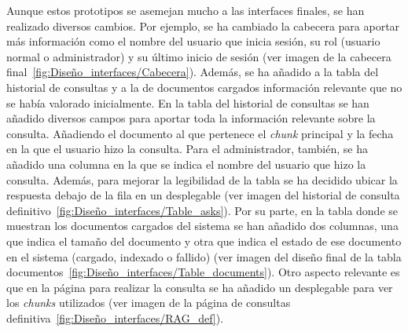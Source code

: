 
Aunque estos prototipos se asemejan mucho a las interfaces finales, se han realizado diversos cambios. Por ejemplo, se ha cambiado la cabecera para aportar más información como el nombre del usuario que inicia sesión, su rol (usuario normal o administrador) y su último inicio de sesión (ver imagen de la cabecera final~\ref{fig:Diseño_interfaces/Cabecera}). Además, se ha añadido a la tabla del historial de consultas y a la de documentos cargados información relevante que no se había valorado inicialmente. En la tabla del historial de consultas se han añadido diversos campos para aportar toda la información relevante sobre la consulta. Añadiendo el documento al que pertenece el \textit{chunk} principal y la fecha en la que el usuario hizo la consulta. Para el administrador, también, se ha añadido una columna en la que se indica el nombre del usuario que hizo la consulta. Además, para mejorar la legibilidad de la tabla se ha decidido ubicar la respuesta debajo de la fila en un desplegable (ver imagen del historial de consulta definitivo~\ref{fig:Diseño_interfaces/Table_asks}). Por su parte, en la tabla donde se muestran los documentos cargados del sistema se han añadido dos columnas, una que indica el tamaño del documento y otra que indica el estado de ese documento en el sistema (cargado, indexado o fallido) (ver imagen del diseño final de la tabla documentos~\ref{fig:Diseño_interfaces/Table_documents}). Otro aspecto relevante es que en la página para realizar la consulta se ha añadido un desplegable para ver los \textit{chunks} utilizados (ver imagen de la página de consultas definitiva~\ref{fig:Diseño_interfaces/RAG_def}).

